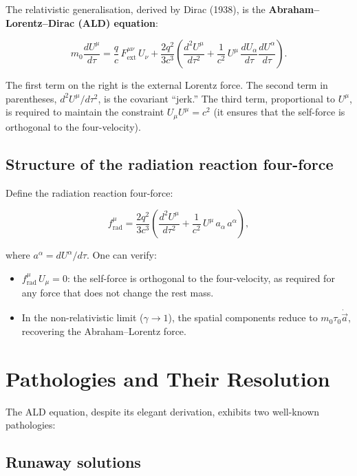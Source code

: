 The relativistic generalisation, derived by Dirac (1938), is the \textbf{Abraham--Lorentz--Dirac (ALD) equation}:

\begin{equation}
\boxed{m_0\frac{dU^\mu}{d\tau} = \frac{q}{c}\,F^{\mu\nu}_{\text{ext}}\,U_\nu + \frac{2q^2}{3c^3}\!\left(\frac{d^2 U^\mu}{d\tau^2} + \frac{1}{c^2}\,U^\mu\,\frac{dU_\alpha}{d\tau}\frac{dU^\alpha}{d\tau}\right).}
\end{equation}

The first term on the right is the external Lorentz force. The second term in parentheses, $d^2U^\mu/d\tau^2$, is the covariant ``jerk.'' The third term, proportional to $U^\mu$, is required to maintain the constraint $U_\mu U^\mu = c^2$ (it ensures that the self-force is orthogonal to the four-velocity).

\subsection{Structure of the radiation reaction four-force}

Define the radiation reaction four-force:

\begin{equation}
f^\mu_{\text{rad}} = \frac{2q^2}{3c^3}\!\left(\frac{d^2 U^\mu}{d\tau^2} + \frac{1}{c^2}\,U^\mu\,a_\alpha\,a^\alpha\right),
\end{equation}

where $a^\alpha = dU^\alpha/d\tau$. One can verify:

\begin{itemize}
\item $f^\mu_{\text{rad}}\,U_\mu = 0$: the self-force is orthogonal to the four-velocity, as required for any force that does not change the rest mass.
\item In the non-relativistic limit ($\gamma \to 1$), the spatial components reduce to $m_0\tau_0\dot{\vec{a}}$, recovering the Abraham--Lorentz force.
\end{itemize}

\section{Pathologies and Their Resolution}

The ALD equation, despite its elegant derivation, exhibits two well-known pathologies:

\subsection{Runaway solutions}

